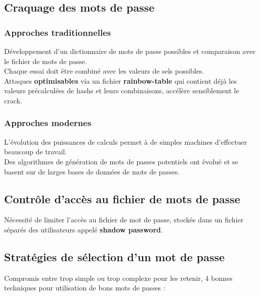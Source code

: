 \documentclass{report}
\begin{document}
		\subsection{Craquage des mots de passe}

			\subsubsection{Approches traditionnelles}

				Développement d'un dictionnaire de mots de passe possibles et comparaison avec le fichier de mots de passe.\\
				Chaque essai doit être combiné avec les valeurs de sels possibles.\\

				Attaques \textbf{optimisables} via un fichier \textbf{rainbow-table} qui contient déjà les valeurs précalculées de hashs et leurs combinaisons, accélère sensiblement le crack.\\

			\subsubsection{Approches modernes}

				L'évolution des puissances de calculs permet à de simples machines d'effectuer beaucoup de travail.\\
				Des algorithmes de génération de mots de passes potentiels ont évolué et se basent sur de larges bases de données de mots de passes.\\

		\subsection{Contrôle d'accès au fichier de mots de passe}

			Nécessité de limiter l'accès au fichier de mot de passe, stockés dans un fichier séparés des utilisateurs appelé \textbf{shadow password}.\\

		\subsection{Stratégies de sélection d'un mot de passe}

			Compromis entre trop simple ou trop complexe pour les retenir, 4 bonnes techniques pour utilisation de bons mots de passes : \\
\end{document}
